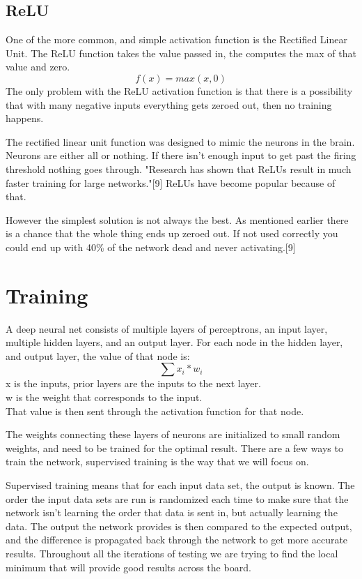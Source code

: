 \documentclass{article}
\begin{document}
\subsection{ReLU}
One of the more common, and simple activation function is the Rectified Linear Unit.
The ReLU function takes the value passed in, the computes the max of that value and zero.
\[f(x) = max(x, 0)\]
The only problem with the ReLU activation function is that there is a possibility that with many negative inputs everything gets zeroed out, then no training happens.

The rectified linear unit function was designed to mimic the neurons in the brain.
Neurons are either all or nothing. 
If there isn't enough input to get past the firing threshold nothing goes through.
"Research has shown that ReLUs result in much faster training for large networks."[9]
ReLUs have become popular because of that.

However the simplest solution is not always the best.
As mentioned earlier there is a chance that the whole thing ends up zeroed out.
If not used correctly you could end up with 40\% of the network dead and never activating.[9]

\section{Training}
A deep neural net consists of multiple layers of perceptrons, an input layer, multiple hidden layers, and an output layer.
For each node in the hidden layer, and output layer, the value of that node is:
\[\sum x_i * w_i\]
x is the inputs, prior layers are the inputs to the next layer. \\
w is the weight that corresponds to the input. \\
That value is then sent through the activation function for that node.

The weights connecting these layers of neurons are initialized to small random weights, and need to be trained for the optimal result.
There are a few ways to train the network, supervised training is the way that we will focus on. 

Supervised training means that for each input data set, the output is known.
The order the input data sets are run is randomized each time to make sure that the network isn't learning the order that data is sent in, but actually learning the data.
The output the network provides is then compared to the expected output, and the difference is propagated back through the network to get more accurate results.
Throughout all the iterations of testing we are trying to find the local minimum that will provide good results across the board.
\end{document}

